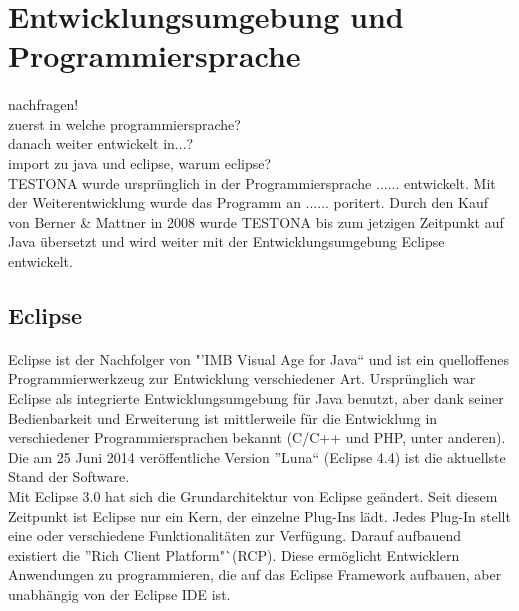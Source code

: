 \paragraph{}


\section{Entwicklungsumgebung und Programmiersprache}
\paragraph{}

nachfragen!\\
zuerst in welche programmiersprache?\\
danach weiter entwickelt in...?\\
import zu java und eclipse, warum eclipse?\\

TESTONA wurde ursprünglich in der Programmiersprache ...... entwickelt. Mit der Weiterentwicklung wurde das Programm an ...... poritert. Durch den Kauf von Berner \& Mattner in 2008 wurde TESTONA bis zum jetzigen Zeitpunkt auf Java übersetzt und wird weiter mit der Entwicklungsumgebung Eclipse entwickelt.

\subsection{Eclipse}
\paragraph{}
Eclipse ist der Nachfolger von "'IMB Visual Age for Java"` und ist ein quelloffenes Programmierwerkzeug zur Entwicklung verschiedener Art. Ursprünglich war Eclipse als integrierte Entwicklungsumgebung für Java benutzt, aber dank seiner Bedienbarkeit und Erweiterung ist mittlerweile für die Entwicklung in verschiedener Programmiersprachen bekannt (C/C++ und PHP, unter anderen). Die am 25 Juni 2014 veröffentliche Version "'Luna"` (Eclipse 4.4) ist die aktuellste Stand der Software. \\

Mit Eclipse 3.0 hat sich die Grundarchitektur von Eclipse geändert. Seit diesem Zeitpunkt ist Eclipse nur ein Kern, der einzelne Plug-Ins lädt. Jedes Plug-In stellt eine oder verschiedene Funktionalitäten zur Verfügung. Darauf aufbauend existiert die "'Rich Client Platform"`(RCP). Diese ermöglicht Entwicklern Anwendungen zu programmieren, die auf das Eclipse Framework aufbauen, aber unabhängig von der Eclipse IDE ist.\cite{EclipseRCP} \cite{Eclipse}\\



